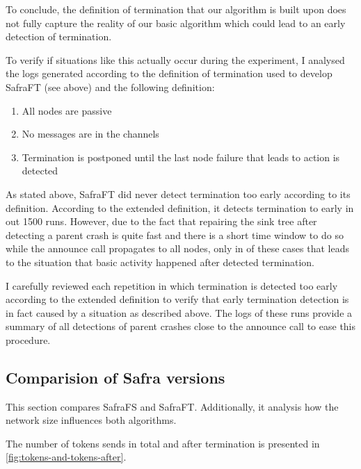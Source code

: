 To conclude, the definition of termination that our algorithm is built upon does not fully capture the reality of our basic algorithm which could lead to an early detection of termination.

To verify if situations like this actually occur during the experiment, I analysed the logs generated according to the definition of termination used to develop SafraFT (see above) and the following definition:
\begin{enumerate}
	\item All nodes are passive
	\item No messages are in the channels
	\item Termination is postponed until the last node failure that leads to action is detected
\end{enumerate}
\label{extended-definition}

As stated above, SafraFT did never detect termination too early according to its definition.
According to the extended definition, it detects termination to early in  out 1500 runs.
However, due to the fact that repairing the sink tree after detecting a parent crash is quite fast and there is a short time window to do so while the announce call propagates to all nodes, only in  of these cases that leads to the situation that basic activity happened after detected termination.


I carefully reviewed each repetition in which termination is detected too early according to the extended definition to verify that early termination detection is in fact caused by a situation as described above.
The logs of these runs provide a summary of all detections of parent crashes close to the announce call to ease this procedure.

\subsection{Comparision of Safra versions}
This section compares SafraFS and SafraFT. 
Additionally, it analysis how the network size influences both algorithms.

The number of tokens sends in total and after termination is presented in \cref{fig:tokens-and-tokens-after}.

